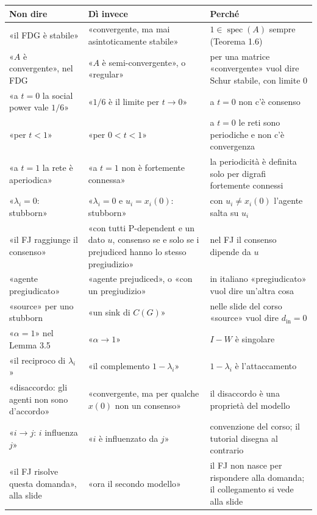 \documentclass[a4paper,10pt]{article}
\newcommand{\fr}[1]{\getrefnumber{P-#1}}      %
\begin{document}
\smallskip
{\small
\begin{tabularx}{\textwidth}{>{\raggedright\arraybackslash}p{}>{\raggedright\arraybackslash}p{}>{\raggedright\arraybackslash}X}
  \toprule
  Non dire & Dì invece & Perché \\
  \midrule
  «il FDG è stabile» & «convergente, ma mai asintoticamente stabile» & $1\in\operatorname{spec}(A)$ sempre (Teorema 1.6) \\
  «$A$ è convergente», nel FDG & «$A$ è semi-convergente», o «regular» & per una matrice «convergente» vuol dire Schur stabile, con limite 0 \\
  «a $t=0$ la social power vale $1/6$» & «$1/6$ è il limite per $t\to0$» & a $t=0$ non c'è consenso \\
  «per $t<1$» & «per $0<t<1$» & a $t=0$ le reti sono periodiche e non c'è convergenza \\
  «a $t=1$ la rete è aperiodica» & «a $t=1$ non è fortemente connessa» & la periodicità è definita solo per digrafi fortemente connessi \\
  «$\lambda_i=0$: stubborn» & «$\lambda_i=0$ e $u_i=x_i(0)$: stubborn» & con $u_i\neq x_i(0)$ l'agente salta su $u_i$ \\
  «il FJ raggiunge il consenso» & «con tutti P-dependent e un dato $u$, consenso se e solo se i prejudiced hanno lo stesso pregiudizio» & nel FJ il consenso dipende da $u$ \\
  «agente pregiudicato» & «agente prejudiced», o «con un pregiudizio» & in italiano «pregiudicato» vuol dire un'altra cosa \\
  «source» per uno stubborn & «un sink di $C(G)$» & nelle slide del corso «source» vuol dire $d_{\mathrm{in}}=0$ \\
  «$\alpha=1$» nel Lemma 3.5 & «$\alpha\to1$» & $I-W$ è singolare \\
  «il reciproco di $\lambda_i$» & «il complemento $1-\lambda_i$» & $1-\lambda_i$ è l'attaccamento \\
  «disaccordo: gli agenti non sono d'accordo» & «convergente, ma per qualche $x(0)$ non un consenso» & il disaccordo è una proprietà del modello \\
  «$i\to j$: $i$ influenza $j$» & «$i$ è influenzato da $j$» & convenzione del corso; il tutorial disegna al contrario \\
  «il FJ risolve questa domanda», alla slide \fr{m-bridge} & «ora il secondo modello» & il FJ non nasce per rispondere alla domanda; il collegamento si vede alla slide \fr{m-back-question} \\
  \bottomrule
\end{tabularx}}
\end{document}
